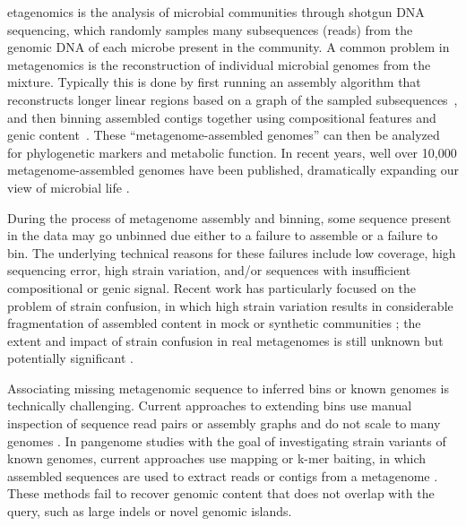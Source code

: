 etagenomics is the analysis of microbial communities through shotgun
DNA sequencing, which randomly samples many subsequences (reads)
from the genomic DNA of each microbe present in the community.
A common problem in metagenomics is the reconstruction of
individual microbial genomes from the mixture.
Typically this is
done by first running an assembly algorithm that reconstructs
longer linear regions based on a graph of the sampled
subsequences~\cite{pell2012scaling}, and then binning assembled
contigs together using compositional features and genic content~\cite{laczny2017busybee,lin2016accurate}.  These
``metagenome-assembled genomes'' can then be
analyzed for phylogenetic markers and metabolic function. In recent years,
well over 10,000 metagenome-assembled genomes have been published,
dramatically expanding our view of microbial life
\cite{Parks2017,Tully2018,Stewart2018,Delmont2018,Hug2016}.

During the process of metagenome assembly and binning, some
sequence present in the data may go unbinned due either to a failure
to assemble \cite{CAMI,Awad155358} or a failure to bin.
The underlying technical reasons for these failures include low
coverage, high sequencing error, high strain variation, and/or sequences
with insufficient compositional or genic signal.  Recent work has
particularly focused on the problem of strain confusion, in which
high strain variation results in considerable fragmentation of assembled
content in mock or synthetic communities \cite{CAMI,Awad155358}; the
extent and impact of strain confusion in real metagenomes is still unknown
but potentially significant \cite{brownstrain,Brito2016,baltic}.

Associating missing metagenomic sequence to inferred bins or known
genomes is technically challenging.  Current approaches to extending
bins use manual inspection of sequence read pairs or assembly graphs
and do not scale to many
genomes \cite{perchlorate,metacherchant}. In pangenome studies with the
goal of investigating strain variants of known genomes,
 current approaches use mapping or k-mer baiting, in which
assembled sequences are used to extract reads or contigs from a
metagenome \cite{desman,Nayfach2016,ekg,mspminer}.
These methods fail to recover genomic content that does not overlap with
the query, such as large indels or novel genomic islands.

